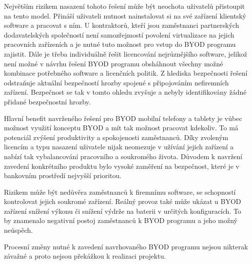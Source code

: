 Největším rizikem nasazení tohoto řešení může být neochota uživatelů přistoupit na tento model. Přináší uživateli nutnost nainstalovat si na své zařízení klientský software a pracovat s ním. U kontraktorů, kteří jsou zaměstnanci partnerských dodavatelských společností není samozřejmostí povolení virtualizace na jejich pracovních zařízeních a je nutné tuto možnost pro vstup do BYOD programu zajistit.  Dále je třeba individuálně řešit licencování nejrůznějšího software, jelikož není možné v návrhu řešení BYOD programu obsháhnout všechny možné kombinace potřebného software a licenčních politik. Z hlediska bezpečnosti řešení odstraňuje aktuální bezpečností hrozby spojené s připojováním nefiremních zařízení. Bezpečnost se tak v tomto ohledu zvyšuje a nebyly identifikovány žádné přidané bezpečnostní hrozby. 

Hlavní benefit navrženého řešení pro BYOD mobilní telefony a tablety je vůbec možnost využití konceptu BYOD a mít tak možnost pracovat kdekoliv. To má potenciál zvýšení produktivity a spokojenosti zaměstnanců. Díky zvoleným licencím a typu nasazení uživatele nijak neomezuje v užívání jejich zařízení a nabízí tak vybalancování pracovního a soukromého života. Důvodem k navržení zavedení konkrétního produktu bylo vysoké zaměření na bezpečnost, které je v bankovním prostředí nejvyšší prioritou.

Rizikem může být nedůvěra zaměstnanců k firemnímu software, se schopností kontrolovat jejich soukromé zařízení. Reálný provoz také může ukázat u BYOD zařízení snížení výkonu či snížení výdrže na baterii v určitých konfiguracích. To by znamenalo negativní postoj zaměstnanců k BYOD programu a jeho možný neúspěch.

Procesní změny nutné k zavedení navrhovaného BYOD programu nejsou nikterak závažné a proto nejsou překážkou k realizaci projektu.


